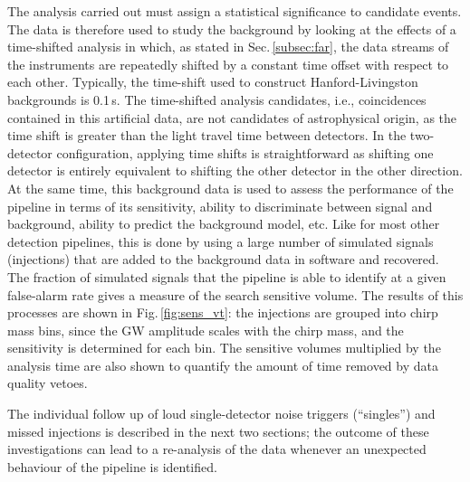 \documentclass[binding=0.6cm, LaM]{sapthesis}
\begin{document}
	The analysis carried out must assign a statistical significance to candidate events.
        The data is therefore used to study the background by looking at the effects of a time-shifted analysis in which, 
	as stated in Sec.\,\ref{subsec:far}, the data streams of the instruments are repeatedly shifted by a constant time offset with respect to each other. 
	Typically, the time-shift used to construct Hanford-Livingston backgrounds is 0.1\,s.
	The time-shifted analysis candidates, i.e., coincidences contained in this artificial data, 
	are not candidates of astrophysical origin, as the time shift is greater than the light travel time between detectors.
	In the two-detector configuration, applying time shifts is straightforward as shifting one detector 
	is entirely equivalent to shifting the other detector in the other direction. 
        At the same time, this background data is used to assess the performance of the pipeline in terms of its sensitivity, 
	ability to discriminate between signal and background, ability to predict the background model, etc. 
	Like for most other detection pipelines, this is done by using a large number of simulated signals (injections) that are added to the background data in software and recovered.
 	The fraction of simulated signals that the pipeline is able to identify at a given false-alarm rate gives a measure of the search sensitive volume.
	The results of this processes are shown in Fig.\,\ref{fig:sens_vt}: 
	the injections are grouped into chirp mass bins, since the GW amplitude scales with the chirp mass,
	and the sensitivity is determined for each bin.
	The sensitive volumes multiplied by the analysis time are also shown to quantify the amount of time removed by data quality vetoes.

        The individual follow up of loud single-detector noise triggers (``singles'') and missed injections is 
	described in the next two sections; the outcome of these investigations can lead to a re-analysis of the data whenever an unexpected behaviour of the pipeline is identified. 
\end{document}
